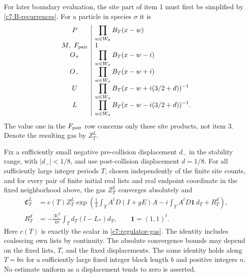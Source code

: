 For later boundary evaluation, the site part of item 1 must first
be simplified by \eqref{c7:B-recurrences}. For a particle in
species $\sigma$ it is
\begin{equation}\label{j:marked-site-factors}
\begin{array}{c|l}
 P&\displaystyle\prod_{w\in W_\sigma}B_T(x-w)\\
 M,\ F_{\rm pair}&1\\
 O_+&\displaystyle\prod_{w\in W_\sigma}B_T(x-w-i)\\
 O_-&\displaystyle\prod_{w\in W_\sigma}B_T(x-w+i)\\
 U&\displaystyle\prod_{w\in W_\sigma}B_T(x-w+i(3/2+d))^{-1}\\
 L&\displaystyle\prod_{w\in W_\sigma}B_T(x-w-i(3/2+d))^{-1}.
\end{array}
\end{equation}
The value one in the $F_{\rm pair}$ row concerns only these site
products, not item 3. Denote the resulting gas by $Z_T^L$.

\begin{proposition}\label{j:marked-gas-identity}
Fix a sufficiently small negative pre-collision displacement
$d_-$ in the stability range, with $|d_-|<1/8$, and use
post-collision displacement $d=1/8$. For all sufficiently large
integer periods $T$, chosen independently of the finite site
counts, and for every pair of finite initial real lists and real
endpoint coordinate in the fixed neighborhood above, the gas
$Z_T^L$ converges absolutely and
\begin{equation}\label{c7:eq-M}
\begin{aligned}
 \mathfrak C_T^L
 &=c(T)Z_T^L
 \exp\left(\frac12\int_T A^tD(I+gE)A
       -i\int_T A^tD\mathbf1\,d_T+R_T^d\right),\\
 R_T^d&=-\frac{|\mathbf1|^2}{4\pi}
              \int_T d_T(l-L_*)d_T,\qquad \mathbf1=(1,1)^t.
\end{aligned}
\end{equation}
Here $c(T)$ is exactly the scalar in \eqref{c7:regulator-gas}.
The identity includes coalescing own lists by continuity. The
absolute convergence bounds may depend on the fixed lists, $T$,
and the fixed displacements. The same identity holds along $T=bn$
for a sufficiently large fixed integer block length $b$ and
positive integers $n$.
No estimate uniform as a displacement tends to zero is asserted.
\end{proposition}

